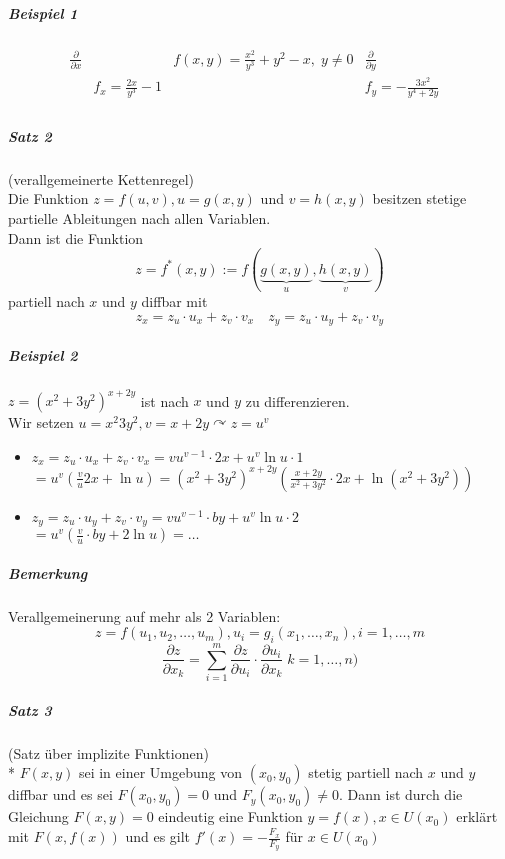 \documentclass[a4paper]{scrartcl}
\begin{document}
\subparagraph{Beispiel 1}
\[\begin{array}{llcrr}
\frac{\partial}{\partial x}
&& f(x,y) = \frac{x^2}{y^3} + y^2 -x , \; y \neq 0 & \frac{\partial}{\partial y}&\\
&f_x=  \frac{2x}{y^3}-1 & & f_y= - \frac{3x^2}{y^4 + 2y}&\\


\end{array}\]

\subparagraph{Satz 2} (verallgemeinerte Kettenregel)\\
Die Funktion $z=f(u,v), u=g(x,y)$ und $v=h(x,y)$ besitzen stetige partielle Ableitungen nach allen Variablen. \\Dann ist die Funktion
\[z=f^* (x,y) := f(\underbrace{g(x,y)}_{u} , \underbrace{h(x,y)}_{v})\]
partiell nach $x$ und $y$ diffbar mit
\[ z_x = z_u \cdot u_x + z_v \cdot v_x \quad z_y = z_u \cdot u_y + z_v \cdot v_y\]

\subparagraph{Beispiel 2} $z=(x^2 + 3y^2 )^{x+2y}$ ist nach $x$ und $y$ zu differenzieren.\\
Wir setzen $u=x^2 3y^2, v=x+2y \curvearrowright z=u^v$

\begin{itemize}
\item $z_x= z_u \cdot u_x + z_v \cdot v_x = vu^{v-1} \cdot 2x + u^v \ln{u} \cdot 1$\\
$=u^v (\frac{v}{u} 2x + \ln{u} ) = (x^2 + 3y^2 )^{x+2y} (\frac{x+2y}{x^2+3y^2} \cdot 2x + \ln{(x^2 + 3y^2)})$
\item $z_y = z_u \cdot u_y + z_v \cdot v_y = vu^{v-1} \cdot by + u^v \ln{u} \cdot 2$\\
$=u^v(\frac{v}{u} \cdot by + 2 \ln{u}) = \dots$
\end{itemize}

\subparagraph{Bemerkung} Verallgemeinerung auf mehr als 2 Variablen:
\[ z=f(u_1,u_2,\dots,u_m), u_i = g_i(x_1,\dots,x_n), i = 1,\dots,m\]
\[ \frac{\partial z}{\partial x_k} = \sum\limits_{i=1}^m \frac{\partial z}{\partial u_i} \cdot \frac{\partial u_i}{\partial x_k} \; k=1,\dots,n)\]

\subparagraph{Satz 3} (Satz über implizite Funktionen)\\*
$F(x,y)$ sei in einer Umgebung von $(x_0,y_0)$ stetig partiell nach $x$ und $y$ diffbar und es sei $F(x_0,y_0) = 0$ und $F_y(x_0,y_0) \neq 0$. Dann ist durch die Gleichung $F(x,y) = 0$ eindeutig eine Funktion $y=f(x), x \in U(x_0)$ erklärt mit $F(x,f(x))$ und es gilt $f'(x) = -\frac{F_x}{F_y}$ für $x \in U(x_0)$
\end{document}
